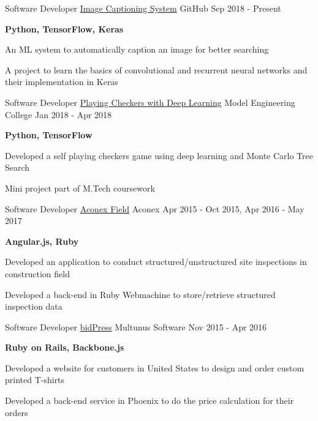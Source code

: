 \begin{cventries} 
  \cventry
    {Software Developer}
    {\href{https://github.com/yedhukrishnan/image-captioning}{Image Captioning System}}
    {GitHub}
    {Sep 2018 - Present}
    {
      \begin{cvitems}
        \item {\textbf{Python, TensorFlow, Keras}}
        \item {An ML system to automatically caption an image for better searching}
        \item {A project to learn the basics of convolutional and recurrent neural networks and their implementation in Keras}
      \end{cvitems}
    } 
  \cventry
    {Software Developer}
    {\href{}{Playing Checkers with Deep Learning}}
    {Model Engineering College}
    {Jan 2018 - Apr 2018}
    {
      \begin{cvitems}
        \item {\textbf{Python, TensorFlow}}
        \item {Developed a self playing checkers game using deep learning and Monte Carlo Tree Search}
        \item {Mini project part of M.Tech coursework}
      \end{cvitems}
    }
  \cventry
    {Software Developer}
    {\href{https://www.aconex.com/support/aconex-field}{Aconex Field}}
    {Aconex}
    {Apr 2015 - Oct 2015, Apr 2016 - May 2017}
    {
      \begin{cvitems}
        \item {\textbf{Angular.js, Ruby}}
        \item {Developed an application to conduct structured/unstructured site inspections in construction field}
        \item {Developed a back-end in Ruby Webmachine to store/retrieve structured inspection data}
      \end{cvitems}
    }
  \cventry
    {Software Developer}
    {\href{https://www.bidpress.com/}{bidPress}}
    {Multunus Software}
    {Nov 2015 - Apr 2016}
    {
      \begin{cvitems}
        \item {\textbf{Ruby on Rails, Backbone.js}}
        \item {Developed a website for customers in United States to design and order custom printed T-shirts}
        \item {Developed a back-end service in Phoenix to do the price calculation for their orders}

\end{cvitems}}
\end{cventries}
